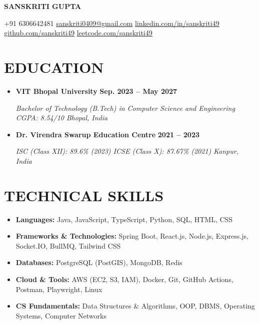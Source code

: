 \documentclass[letterpaper,11pt]{article}
\newcommand{\resumeLink}[2]{\href{#1}{\underline{#2}}}
\newcommand{\resumeSubheading}[4]{%
  \item
  \textbf{#1} \hfill {\small #2}\par
  {\small\textit{#3} \hfill \textit{#4}}\par
}
\newcommand{\resumeSubHeadingListStart}{%
  \begin{itemize}[leftmargin=0pt,label={},itemsep=1pt,topsep=0pt,parsep=0pt,partopsep=0pt]
}
\newcommand{\resumeSubHeadingListEnd}{\end{itemize}}
\begin{document}
\begin{center}
  {\fontsize{20pt}{23pt}\selectfont\bfseries SANSKRITI GUPTA}\par
  \vspace{2.5pt}
  {\small
  +91 6306642481 \quad \textbar{} \quad
  \resumeLink{mailto:sanskriti0409@gmail.com}{sanskriti0409@gmail.com} \quad \textbar{} \quad
  \resumeLink{https://linkedin.com/in/sanskriti49}{linkedin.com/in/sanskriti49} \quad \textbar{} \quad
  \resumeLink{https://github.com/sanskriti49}{github.com/sanskriti49} \quad \textbar{} \quad
  \resumeLink{https://leetcode.com/u/sanskriti49}{leetcode.com/sanskriti49}\par
  }
\end{center}
\vspace{-4pt}

\section{EDUCATION}
\resumeSubHeadingListStart
  \resumeSubheading
    {VIT Bhopal University}{\textbf{Sep. 2023 -- May 2027}}
    {Bachelor of Technology (B.Tech) in Computer Science and Engineering \textbar{} CGPA: 8.54/10}{Bhopal, India}
  \resumeSubheading
    {Dr. Virendra Swarup Education Centre}{\textbf{2021 -- 2023}}
    {ISC (Class XII): 89.6\% (2023) \textbar{} ICSE (Class X): 87.67\% (2021)}{Kanpur, India}
\resumeSubHeadingListEnd

\section{TECHNICAL SKILLS}
{\small
\begin{itemize}[leftmargin=0pt,label={},itemsep=1.2pt,topsep=1pt,parsep=0pt,partopsep=0pt]
  \item \textbf{Languages:} Java, JavaScript, TypeScript, Python, SQL, HTML, CSS
  \item \textbf{Frameworks \& Technologies:} Spring Boot, React.js, Node.js, Express.js, Socket.IO, BullMQ, Tailwind CSS
  \item \textbf{Databases:} PostgreSQL (PostGIS), MongoDB, Redis
  \item \textbf{Cloud \& Tools:} AWS (EC2, S3, IAM), Docker, Git, GitHub Actions, Postman, Playwright, Linux
  \item \textbf{CS Fundamentals:} Data Structures \& Algorithms, OOP, DBMS, Operating Systems, Computer Networks
\end{itemize}
}
\end{document}
